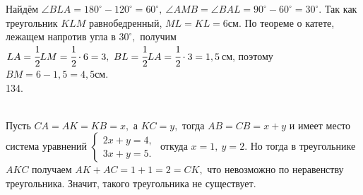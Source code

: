 \documentclass[12pt]{article}
\begin{document}
Найдём $\angle BLA=180^\circ-120^\circ=60^\circ,\ \angle AMB=\angle BAL=90^\circ-60^\circ=30^\circ.$ Так как треугольник $KLM$ равнобедренный, $ML=KL=6$см. По теореме о катете, лежащем напротив угла в $30^\circ,$ получим $LA=\cfrac{1}{2}LM=\cfrac{1}{2}\cdot6=3,\ BL=\cfrac{1}{2}LA=\cfrac{1}{2}\cdot3=1,5$см, поэтому $BM=6-1,5=4,5$см.\\
134. \begin{figure}[ht!]
\end{figure}\\
Пусть $CA=AK=KB=x,$ а $KC=y,$ тогда $AB=CB=x+y$ и имеет место система уравнений $\begin{cases} 2x+y=4,\\ 3x+y=5.\end{cases}$ откуда $x=1,\ y=2.$ Но тогда в треугольнике $AKC$ получаем $AK+AC=1+1=2=CK,$ что невозможно по неравенству треугольника. Значит, такого треугольника не существует.\newpage\noindent
\end{document}
